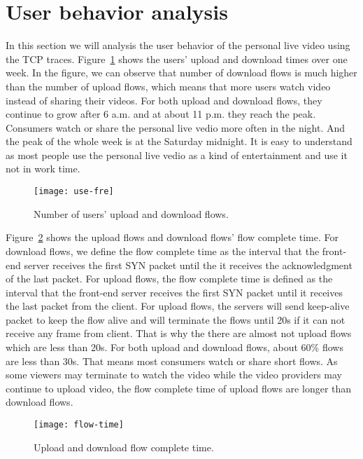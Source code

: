 
\section{User behavior analysis}
\label{sec:user-behavior}

In this section we will analysis the user behavior of the personal live video using the TCP traces. Figure~\ref{fig:use-fre} shows the users' upload and download times over one week. In the figure, we can observe that number of download flows is much higher than the number of upload flows, which means that more users watch video instead of sharing their videos. For both upload and download flows, they continue to grow after 6 a.m. and at about 11 p.m. they reach the peak. Consumers watch or share the personal live vedio more often in the night. And the peak of the whole week is at the Saturday  midnight. It is easy to understand as most people use the personal live vedio as a kind of entertainment and use it not in work time. 

\begin{figure}[ht]
	\centering
	\texttt{[image: use-fre]}
	\caption{Number of users' upload and download flows.}
	\label{fig:use-fre}
	\termspace
\end{figure}

Figure~\ref{fig:flow-time} shows the upload flows and download flows' flow complete time. For download flows, we define the flow complete time as the interval that the front-end server receives the first SYN packet until the it receives the acknowledgment of the last packet. For upload flows, the flow complete time is defined as the interval that the front-end server receives the first SYN packet until it receives the last packet from the client. For upload flows, the servers will send keep-alive packet to keep the flow alive and will terminate the flows until 20s if it can not receive any frame from client. That is why the there are almost not upload flows which are less than 20s. For both upload and download flows, about 60\% flows are less than 30s. That means most consumers watch or share short flows. As some viewers may terminate to watch the video while the video providers may continue to upload video, the flow complete time of upload flows are longer than download flows.   

\begin{figure}[ht]
	\centering
	\texttt{[image: flow-time]}
	\caption{Upload and download flow complete time.}
	\label{fig:flow-time}
	\termspace
\end{figure}

